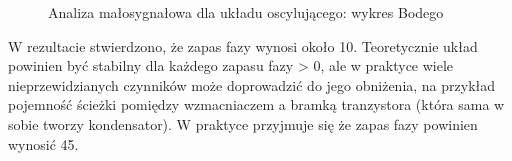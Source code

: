 \documentclass[polish,engineer]{polsl-msth}
\begin{document}
\begin{figure}[hbtp]
     \caption{Analiza małosygnałowa dla układu oscylującego: wykres Bodego \label{img:1strun}}
\end{figure}
W rezultacie stwierdzono, że zapas fazy wynosi około 10\degree. Teoretycznie układ powinien być stabilny dla każdego zapasu fazy > 0\degree, ale w praktyce wiele nieprzewidzianych czynników może doprowadzić do jego obniżenia, na przykład pojemność ścieżki pomiędzy wzmacniaczem a bramką tranzystora (która sama w sobie tworzy kondensator). W praktyce przyjmuje się że zapas fazy powinien wynosić 45\degree \cite{PhaseMargin_TERRELL1996383}.
\end{document}

